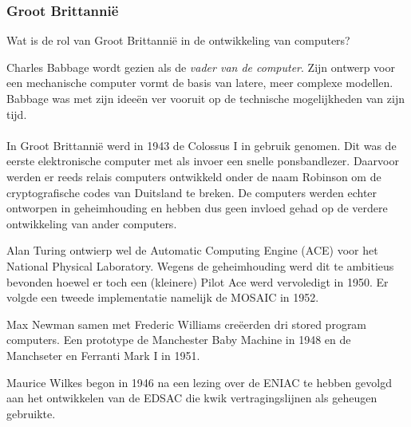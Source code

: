 \documentclass[../main.tex]{subfiles}
\begin{document}
\subsubsection{Groot Brittanni\"e}
\begin{question}
Wat is de rol van Groot Brittanni\"e in de ontwikkeling van computers?
\end{question}
\begin{solution}
Charles Babbage wordt gezien als de \emph{vader van de computer}. Zijn ontwerp voor een mechanische computer vormt de basis van latere, meer complexe modellen. Babbage was met zijn idee\"en ver vooruit op de technische mogelijkheden van
zijn tijd.
\\\\
In Groot Brittanni\"e werd in 1943 de Colossus I in gebruik genomen. Dit was de eerste elektronische computer met als invoer een snelle ponsbandlezer.
Daarvoor werden er reeds relais computers ontwikkeld onder de naam Robinson om de cryptografische codes van Duitsland te breken.
De computers werden echter ontworpen in geheimhouding en hebben dus geen invloed gehad op de verdere ontwikkeling van ander computers.

Alan Turing ontwierp wel de Automatic Computing Engine (ACE) voor het National Physical Laboratory.
Wegens de geheimhouding werd dit te ambitieus bevonden hoewel er toch een (kleinere) Pilot Ace werd vervoledigt in 1950.
Er volgde een tweede implementatie namelijk de MOSAIC in 1952.

Max Newman samen met Frederic Williams cre\"eerden dri stored program computers.
Een prototype de Manchester Baby Machine in 1948 en de Manchseter en Ferranti Mark I in 1951.

Maurice Wilkes  begon in 1946 na een lezing over de ENIAC te hebben gevolgd aan het ontwikkelen van de EDSAC die kwik vertragingslijnen als geheugen gebruikte.
\end{solution}
\end{document}
